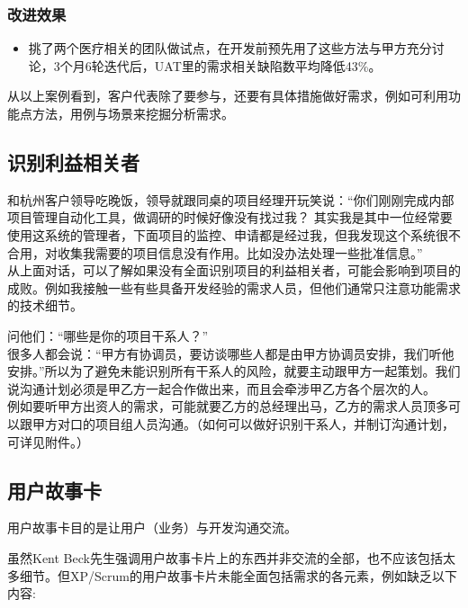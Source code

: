 \hypertarget{ux6539ux8fdbux6548ux679c}{%
\subsubsection{改进效果}\label{ux6539ux8fdbux6548ux679c}}

\begin{itemize}
\tightlist
\item
  挑了两个医疗相关的团队做试点，在开发前预先用了这些方法与甲方充分讨论，3个月6轮迭代后，UAT里的需求相关缺陷数平均降低43\%。
\end{itemize}

从以上案例看到，客户代表除了要参与，还要有具体措施做好需求，例如可利用功能点方法，用例与场景来挖掘分析需求。

\hypertarget{ux8bc6ux522bux5229ux76caux76f8ux5173ux8005}{%
\subsection{识别利益相关者}\label{ux8bc6ux522bux5229ux76caux76f8ux5173ux8005}}

和杭州客户领导吃晚饭，领导就跟同桌的项目经理开玩笑说：``你们刚刚完成内部项目管理自动化工具，做调研的时候好像没有找过我？
其实我是其中一位经常要使用这系统的管理者，下面项目的监控、申请都是经过我，但我发现这个系统很不合用，对收集我需要的项目信息没有作用。比如没办法处理一些批准信息。''\\
从上面对话，可以了解如果没有全面识别项目的利益相关者，可能会影响到项目的成败。例如我接触一些有些具备开发经验的需求人员，但他们通常只注意功能需求的技术细节。

问他们：“哪些是你的项目干系人？”\\
很多人都会说：“甲方有协调员，要访谈哪些人都是由甲方协调员安排，我们听他安排。”所以为了避免未能识别所有干系人的风险，就要主动跟甲方一起策划。我们说沟通计划必须是甲乙方一起合作做出来，而且会牵涉甲乙方各个层次的人。\\
例如要听甲方出资人的需求，可能就要乙方的总经理出马，乙方的需求人员顶多可以跟甲方对口的项目组人员沟通。（如何可以做好识别干系人，并制订沟通计划，可详见附件。）

\hypertarget{ux7528ux6237ux6545ux4e8bux5361}{%
\subsection{用户故事卡}\label{ux7528ux6237ux6545ux4e8bux5361}}

用户故事卡目的是让用户（业务）与开发沟通交流。

虽然Kent
Beck先生强调用户故事卡片上的东西并非交流的全部，也不应该包括太多细节。但XP/Scrum的用户故事卡片未能全面包括需求的各元素，例如缺乏以下内容:

